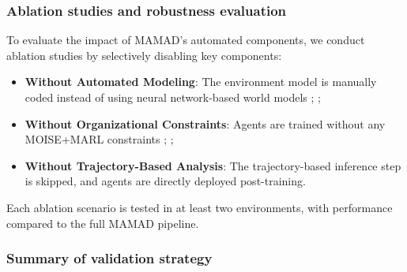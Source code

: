 \documentclass[pdflatex,sn-mathphys-num]{sn-jnl}%
\theoremstyle{thmstyleone}%
\theoremstyle{thmstyletwo}%
\theoremstyle{thmstylethree}%
\begin{document}
\subsubsection{Ablation studies and robustness evaluation}
To evaluate the impact of MAMAD's automated components, we conduct ablation studies by selectively disabling key components:
\begin{itemize}
    \item \textbf{Without Automated Modeling}: The environment model is manually coded instead of using neural network-based world models ; ;
    \item \textbf{Without Organizational Constraints}: Agents are trained without any MOISE+MARL constraints ; ;
    \item \textbf{Without Trajectory-Based Analysis}: The trajectory-based inference step is skipped, and agents are directly deployed post-training.
\end{itemize}

Each ablation scenario is tested in at least two environments, with performance compared to the full MAMAD pipeline.


\subsubsection{Summary of validation strategy}
\end{document}
